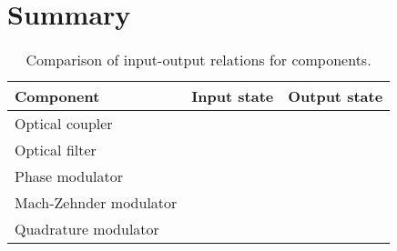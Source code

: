 \section*{Summary}

\begin{table}[htb]
	\centering	
	\begin{tabular}{lcc}
		\toprule
			Component & Input state & Output state \\
		\midrule
			Optical coupler & & \\
			Optical filter & & \\
			Phase modulator & & \\
			Mach-Zehnder modulator & & \\
			Quadrature modulator & & \\
		\bottomrule
	\end{tabular}
	\caption{Comparison of input-output relations for components.}
\end{table}